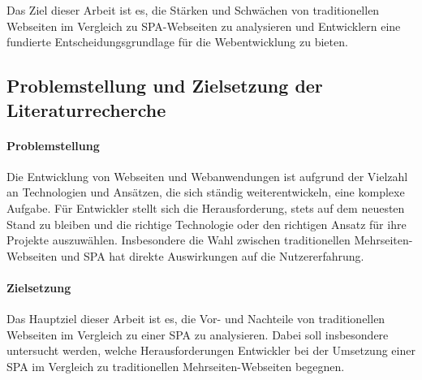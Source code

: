 Das Ziel dieser Arbeit ist es, die Stärken und Schwächen von traditionellen Webseiten im Vergleich zu SPA-Webseiten zu analysieren und Entwicklern eine fundierte Entscheidungsgrundlage für die Webentwicklung zu bieten.


\subsection{Problemstellung und Zielsetzung der Literaturrecherche}

\paragraph*{Problemstellung}
Die Entwicklung von Webseiten und Webanwendungen ist aufgrund der Vielzahl an Technologien und Ansätzen, die sich ständig weiterentwickeln, eine komplexe Aufgabe. 
Für Entwickler stellt sich die Herausforderung, stets auf dem neuesten Stand zu bleiben und die richtige Technologie oder den richtigen Ansatz für ihre Projekte auszuwählen. 
Insbesondere die Wahl zwischen traditionellen Mehrseiten-Webseiten und \ac{SPA} hat direkte Auswirkungen auf die Nutzererfahrung.

\paragraph*{Zielsetzung}
Das Hauptziel dieser Arbeit ist es, die Vor- und Nachteile von traditionellen Webseiten im Vergleich zu einer \ac{SPA} zu analysieren. 
Dabei soll insbesondere untersucht werden, welche Herausforderungen Entwickler bei der Umsetzung einer \ac{SPA} im Vergleich zu traditionellen Mehrseiten-Webseiten begegnen.


